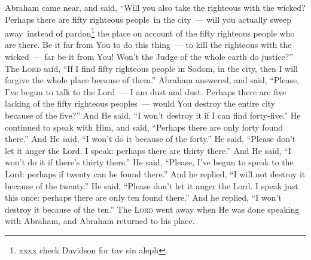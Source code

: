 \begin{inparaenum}
     Abraham came near, and said, ``Will you also take the righteous with the wicked?%
     Perhaps there are fifty righteous people\understood\ in the city~--- will you actually sweep away\understood\ instead of pardon\footnote{xxxx check Davidson for tav sin aleph} the place on account of the fifty righteous people who are there.%
     Be it far from You to do this thing~--- to kill the righteous with the wicked~--- far be it from You! Won't the Judge of the whole earth do justice?''%
     The \textsc{Lord} said, ``If I find fifty righteous people in Sodom, in the city, then I will forgive the whole place because of them.''%
     Abraham answered, and said, ``Please, I've begun to talk to the Lord~--- I am dust and dust.%
     Perhaps there are five lacking of the fifty righteous peoples~--- would You destroy the entire city because of the five?'' And He said, ``I won't destroy it if I can find forty-five.''%
     He continued to speak with Him, and said, ``Perhaps there are only forty found there.'' And He said, ``I won't do it because of the forty.''%
     He said, ``Please don't let it anger the Lord. I speak: perhaps there are thirty there.'' And He said, ``I won't do it if there's thirty there.''%
     He said, ``Please, I've begun to speak to the Lord: perhaps if twenty can be found there.'' And he replied, ``I will not destroy it because of the twenty.''%
     He said, ``Please don't let it anger the Lord. I speak just this once: perhaps there are only ten found there.'' And he replied, ``I won't destroy it because of the ten.''%
     The \textsc{Lord} went away when He was done speaking with Abraham, and Abraham returned to his place.%
\end{inparaenum}

